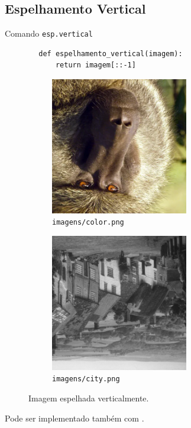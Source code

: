 \subsection{Espelhamento Vertical}

\begin{listing}[H]
    \caption{Comando \texttt{esp.vertical}}

    \begin{verbatim}
        def espelhamento_vertical(imagem):
            return imagem[::-1]
    \end{verbatim}
\end{listing}

\begin{figure}[htb]
    \centering
    \begin{subfigure}{0.45\textwidth}
        \centering
        \includegraphics[width=6cm]{resultados/colorflip.png}
        \caption{\texttt{imagens/color.png}}
    \end{subfigure}%
    \begin{subfigure}{0.45\textwidth}
        \centering
        \includegraphics[width=6cm]{resultados/cityflip.png}
        \caption{\texttt{imagens/city.png}}
    \end{subfigure}

    \caption{Imagem espelhada verticalmente.}
\end{figure}

Pode ser implementado também com  \autocite{ref:flip}.
